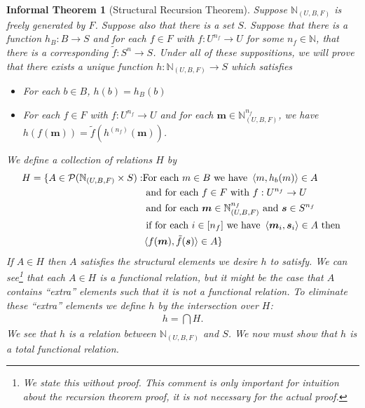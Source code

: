 \documentclass[12pt]{article}
\theoremstyle{break}
\theoremstyle{break}
\theoremstyle{break}
\theoremstyle{break}
\theoremstyle{break}
\newtheorem{informal definition}[definition]{Informal Definition}
\theoremstyle{break}
\newtheorem{informal theorem}[theorem]{Informal Theorem}
\newcommand{\bv}[1]{\boldsymbol{#1}}
\newcommand{\mc}[1]{\mathcal{#1}}
\newcommand{\natnum}[0]{\mathbb{N}}
\begin{document}
	\begin{informal theorem}[Structural Recursion Theorem]
		Suppose $\natnum_{(U, B, F)}$ is freely generated by $F$.
		Suppose also that there is a set $S$.
		Suppose that there is a function $h_B:B \to S$ and for each $f\in F$ with $f:U^{n_f} \to U$ for some $n_f\in \natnum$, that there is a corresponding $\tilde{f}:S^n \to S$.
		Under all of these suppositions, we will prove that there exists a unique function $h:\natnum_{(U, B, F)}\to S$ which satisfies
		\begin{itemize}
			\item{For each $b\in B$, $h(b) = h_B(b)$}
			\item{For each $f\in F$ with $f:U^{n_f}\to U$ and for each $\bv{m}\in \natnum_{(U, B, F)}^{n_f}$, we have $h(f(\bv{m})) = \tilde{f}(h^{(n_f)}(\bv{m}))$.}
		\end{itemize}
		
		We define a collection of relations $H$ by
		\begin{align*}
			H = \{A \in \mc{P}(\natnum_{(U, B, F)}\times S):&
			\text{For each } m\in B \text{ we have } \braket{m, h_b(m)} \in A\\ 
			&\text{ and  for each } f\in F \text{ with } f: U^{n_f} \to U \\
			&\text{ and for each } \bv{m}\in \natnum_{(U, B, F)}^{n_f} \text{ and } \bv{s}\in S^{n_f}\\
			&\text{ if for each } i \in [n_f] \text{ we have } \braket{\bv{m}_i, \bv{s}_i} \in A \text{ then }\\
			&\braket{f(\bv{m}), \tilde{f}(\bv{s})} \in A\}
		\end{align*}
		If $A\in H$ then $A$ satisfies the structural elements we desire $h$ to satisfy.
		We can see\footnote{We state this without proof. This comment is only important for intuition about the recursion theorem proof, it is not necessary for the actual proof.} that each $A\in H$ is a functional relation, but it might be the case that $A$ contains ``extra'' elements such that it is not a functional relation.
		To eliminate these ``extra'' elements we define $h$ by the intersection over $H$:
		\begin{align*}
			h = \bigcap H.
		\end{align*}
		We see that $h$ is a relation between $\natnum_{(U, B, F)}$ and $S$.
		We now must show that $h$ is a total functional relation.
		

\end{informal theorem}
\end{document}
